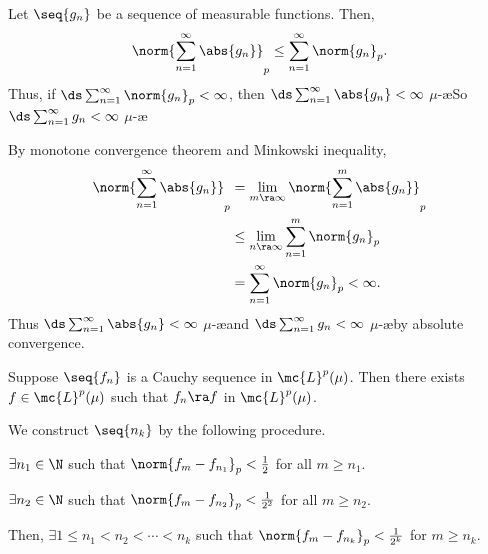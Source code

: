 \lemma Let \(\seq{g_n}\) be a sequence of measurable functions. Then,
\[
    \norm{\sum_{n=1}^{\infty} \abs{g_n}}_p \leq \sum_{n=1}^{\infty} \norm{g_n}_p.
\]
Thus, if \(\ds \sum_{n=1}^{\infty} \norm{g_n}_p < \infty\), then \(\ds \sum_{n=1}^{\infty} \abs{g_n} < \infty\) \(\mu\)-\ae So \(\ds \sum_{n=1}^{\infty} g_n < \infty\) \(\mu\)-\ae

\pf By monotone convergence theorem and Minkowski inequality,
\[
    \begin{aligned}
        \norm{\sum_{n=1}^{\infty} \abs{g_n}}_p & = \lim_{m \ra \infty} \norm{\sum_{n=1}^{m} \abs{g_n}}_p \\
                                               & \leq \lim_{n \ra \infty} \sum_{n=1}^{m} \norm{g_n}_p    \\
                                               & = \sum_{n=1}^{\infty} \norm{g_n}_p < \infty.
    \end{aligned}
\]
Thus \(\ds \sum_{n=1}^{\infty} \abs{g_n} < \infty\) \(\mu\)-\ae and \(\ds \sum_{n=1}^{\infty} g_n < \infty\) \(\mu\)-\ae by absolute convergence.


  Suppose \(\seq{f_n}\) is a Cauchy sequence in \(\mc{L}^{p}(\mu)\). Then there exists \(f \in \mc{L}^{p}(\mu)\) such that \(f_n \ra f\) in \(\mc{L}^{p}(\mu)\).

\pf We construct \(\seq{n_k}\) by the following procedure.

\quad \(\exists n_1 \in \N\) such that \(\norm{f_m - f_{n_1}}_p < \frac{1}{2}\) for all \(m \geq n_1\).

\quad \(\exists n_2 \in \N\) such that \(\norm{f_m - f_{n_2}}_p < \frac{1}{2^2}\) for all \(m \geq n_2\).

Then, \(\exists 1 \leq n_1 < n_2 < \cdots < n_k\) such that \(\norm{f_m - f_{n_k}}_p < \frac{1}{2^k}\) for \(m \geq n_k\).

